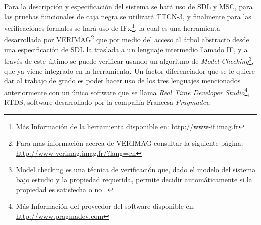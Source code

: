 Para la descripci\'on y especificaci\'on del sistema se har\'a uso de SDL y 
MSC, para las pruebas funcionales de caja negra se utilizar\'a TTCN-3, y 
finalmente para las verificaciones formales se har\'a uso de IFx\footnote{M\'as 
Informaci\'on de la herramienta disponible en: \url{http://www-if.imag.fr}}, la cual es una 
herramienta desarrollada por VERIMAG\footnote{Para mas informaci\'on acerca de VERIMAG consultar la siguiente p\'agina: \url{http://www-verimag.imag.fr/?lang=en}} que por medio del acceso al \'arbol 
abstracto desde una especificaci\'on de SDL la traslada a un lenguaje intermedio 
llamado IF,  y a trav\'es de este \'ultimo se puede verificar usando un 
algoritmo de \textit{Model Checking}\footnote{Model checking es una t\'ecnica 
de verificaci\'on que, dado el modelo del sistema bajo estudio y la propiedad 
requerida, permite decidir autom\'aticamente si la propiedad es satisfecha o no 
~\cite{Clarke1996,Hames2009}}, que ya viene 
integrado en la herramienta. Un factor diferenciador que se le quiere dar al 
trabajo de grado es poder hacer uso de los tres lenguajes mencionados 
anteriormente con un \'unico software que se llama \textit{Real Time Developer 
Studio}\footnote{M\'as Informaci\'on del proveedor del 
software disponible en: \url{http://www.pragmadev.com}}, RTDS, software desarrollado por la 
compa\~n\'ia Francesa \textit{Pragmadev}.

